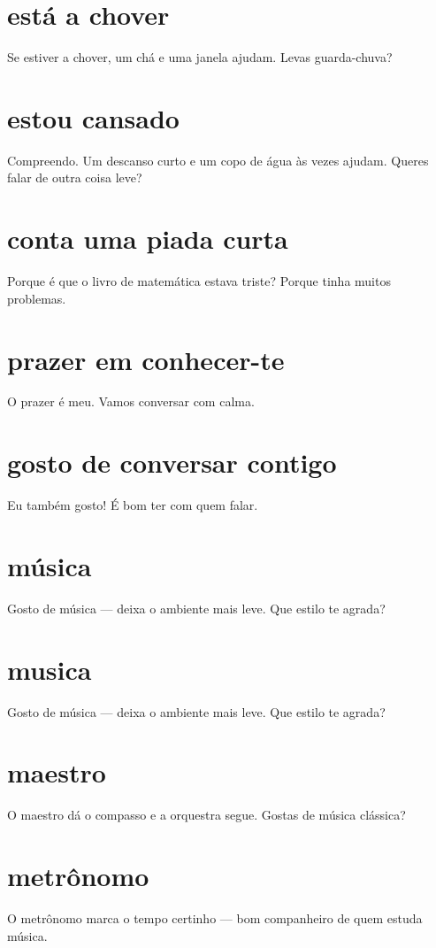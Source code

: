 \documentclass[11pt,a4paper]{article}
\begin{document}
\section{está a chover}
Se estiver a chover, um chá e uma janela ajudam. Levas guarda-chuva?

\section{estou cansado}
Compreendo. Um descanso curto e um copo de água às vezes ajudam. Queres falar de outra coisa leve?

\section{conta uma piada curta}
Porque é que o livro de matemática estava triste? Porque tinha muitos problemas.

\section{prazer em conhecer-te}
O prazer é meu. Vamos conversar com calma.

\section{gosto de conversar contigo}
Eu também gosto! É bom ter com quem falar.

\section{música}
Gosto de música --- deixa o ambiente mais leve. Que estilo te agrada?

\section{musica}
Gosto de música --- deixa o ambiente mais leve. Que estilo te agrada?

\section{maestro}
O maestro dá o compasso e a orquestra segue. Gostas de música clássica?

\section{metrônomo}
O metrônomo marca o tempo certinho --- bom companheiro de quem estuda música.
\end{document}
